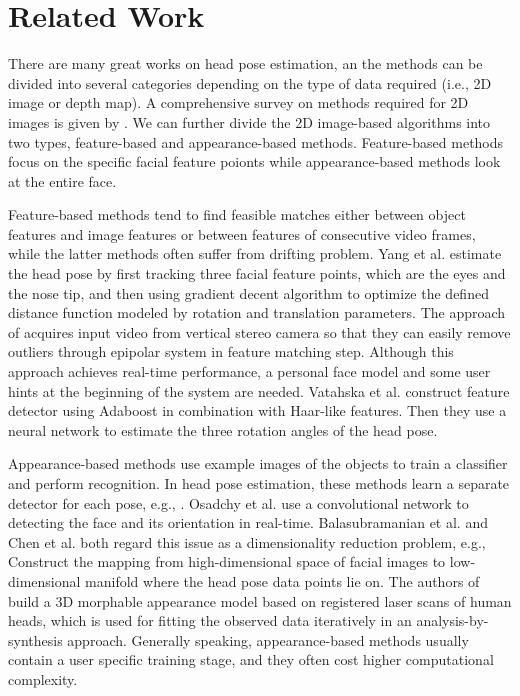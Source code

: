 \section{Related Work}
\label{sec:RelatedWork}
There are many great works on head pose estimation, an the methods can be divided into several categories depending on the type of data required (i.e., 2D image or depth map). A comprehensive survey on methods required for 2D images is given by \cite{Ref_Survey}. We can further divide the 2D image-based algorithms into two types, feature-based \cite{Ref1,Ref8,Ref10,Ref11,Ref18} and appearance-based \cite{Ref2,Ref4,Ref5,Ref6,Ref7,Ref17,Ref18} methods. Feature-based methods focus on the specific facial feature poionts while appearance-based methods look at the entire face.

Feature-based methods tend to find feasible matches either between object features and image features or between features of consecutive video frames, while the latter methods often suffer from drifting problem. Yang et al. \cite{patent} estimate the head pose by first tracking three facial feature points, which are the eyes and the nose tip, and then using gradient decent algorithm to optimize the defined distance function modeled by rotation and translation parameters. The approach of \cite{Ref1} acquires input video from vertical stereo camera so that they can easily remove outliers through epipolar system in feature matching step. Although this approach achieves real-time performance, a personal face model and some user hints at the beginning of the system are needed. Vatahska et al. \cite{Ref8} construct feature detector using Adaboost in combination with Haar-like features. Then they use a neural network to estimate the three rotation angles of the head pose.

Appearance-based methods use example images of the objects to train a classifier and perform recognition. In head pose estimation, these methods learn a separate detector for each pose, e.g., \cite{Ref2,Ref7}. Osadchy et al. \cite{Ref5} use a convolutional network to detecting the face and its orientation in real-time. Balasubramanian et al. \cite{Ref4} and Chen et al. \cite{Ref17} both regard this issue as a dimensionality reduction problem, e.g., Construct the mapping from high-dimensional space of facial images to low-dimensional manifold where the head pose data points lie on. The authors of \cite{Ref6} build a 3D morphable appearance model based on registered laser scans of human heads, which is used for fitting the observed data iteratively in an analysis-by-synthesis approach. Generally speaking, appearance-based methods usually contain a user specific training stage, and they often cost higher computational complexity.

